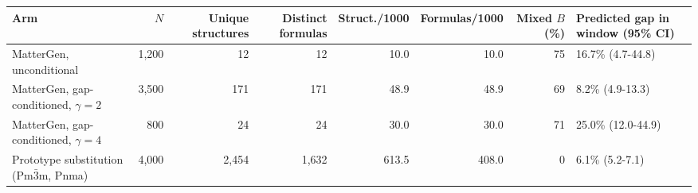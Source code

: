 \begin{tabular}{@{}lrrrrrrl@{}}\toprule
Arm & $N$ & Unique structures & Distinct formulas & Struct./1000 & Formulas/1000 & Mixed $B$ (\%) & Predicted gap in window (95\% CI)\\\midrule
MatterGen, unconditional & 1,200 & 12 & 12 & 10.0 & 10.0 & 75 & 16.7\% (4.7-44.8) \\
MatterGen, gap-conditioned, $\gamma=2$ & 3,500 & 171 & 171 & 48.9 & 48.9 & 69 & 8.2\% (4.9-13.3) \\
MatterGen, gap-conditioned, $\gamma=4$ & 800 & 24 & 24 & 30.0 & 30.0 & 71 & 25.0\% (12.0-44.9) \\
Prototype substitution (Pm$\bar3$m, Pnma) & 4,000 & 2,454 & 1,632 & 613.5 & 408.0 & 0 & 6.1\% (5.2-7.1) \\
\bottomrule\end{tabular}
